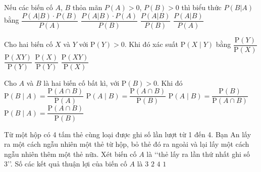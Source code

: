 

\begin{ex}%
	Nếu các biến cố $A$, $B$ thỏa mãn $P(A)>0$, $P(B)>0$ thì biểu thức $P\left(B|A\right)  $ bằng
	\choice 
		{\True $\dfrac{P\left(A|B\right)\cdot P(B)}{P(A)}$} 
		 {$\dfrac{P\left(A|B\right)\cdot P(A)}{P(B)}$}
		 {$\dfrac{P\left(A|B\right)}{P(B)}$}
		 {$\dfrac{P\left(A|B\right)}{P(A)}$}
\end{ex}

\begin{ex}%
	Cho hai biến cố  $X$ và $Y$ với $\mathrm{P}(Y) > 0$. Khi đó xác suất $\mathrm{P}(X\mid Y)$ bằng
	\choice 
		 {$\dfrac{\mathrm{P}(Y)}{\mathrm{P}(X)}$}
		 {$\dfrac{\mathrm{P}(XY)}{\mathrm{P}(Y)}$}
		{\True  $\dfrac{\mathrm{P}(X)}{\mathrm{P}(Y)}$}
		 {$\dfrac{\mathrm{P}(XY)}{\mathrm{P}(X)}$}
\end{ex}

\begin{ex}%
	Cho $A$ và $B$ là hai biến cố bất kì, với $\mathrm{P}(B)>0$.  Khi đó
	 \choice
		{$\mathrm{P}\left(B\mid A\right)=\dfrac{\mathrm{P}\left(A\cap B\right)}{\mathrm{P}(A)}$} 
		 {\True $\mathrm{P}\left(A\mid B\right)=\dfrac{\mathrm{P}\left(A\cap B\right)}{\mathrm{P}(B)}$}
		{$\mathrm{P}\left(A\mid  B\right)=\dfrac{\mathrm{P}(B)}{\mathrm{P}\left(A\cap B\right)}$}
		{$\mathrm{P}\left(B\mid A\right)=\dfrac{\mathrm{P}\left(A\cap  B\right)}{\mathrm{P}(B)}$}
\end{ex}

\begin{ex}%
	Từ một hộp có 4 tấm thẻ cùng  loại được ghi số lần lượt từ 1 đến 4. Bạn An lấy ra một cách ngẫu nhiên một thẻ từ hộp, bỏ thẻ đó ra ngoài và lại lấy một cách ngẫu nhiên thêm một thẻ nữa. Xét biến cố $A$ là \lq\lq thẻ lấy ra lần thứ nhất ghi số 3\rq\rq. Số các kết quả thuận lợi của biến cố $A$ là
	 \choice
		{\True $3$} 
		 {$2$}
		{$4$} 
		{$1$} 
\end{ex}

